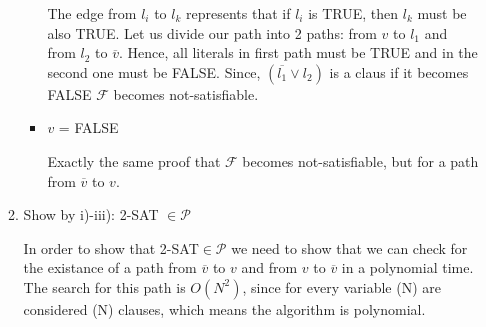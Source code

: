\documentclass{homework}
\begin{document}
\begin{enumerate}[label=(\alph*)]
\begin{enumerate}[label=(\roman*)]
\begin{itemize}
		The edge from $l_i$ to $l_k$ represents that if $l_i$ is TRUE, then $l_k$ must be also TRUE. Let us divide our path into 2 paths: from $v$ to $l_1$ and from $l_2$ to $\overline{v}$. Hence, all literals in first path must be TRUE and in the second one must be FALSE. Since, $(\overline{l_1} \lor l_2)$ is a claus if it becomes FALSE $\mathcal{F}$ becomes not-satisfiable.
		\item $v$ = FALSE
		
		Exactly the same proof that $\mathcal{F}$ becomes not-satisfiable, but for a path from $\overline{v}$ to $v$.
	\end{itemize}
	\item Show by i)-iii): 2-SAT $\in \mathcal{P}$

	In order to show that 2-SAT$\in \mathcal{P}$ we need to show that we can check for the existance of a path from $\overline{v}$ to $v$ and from $v$ to $\overline{v}$ in a polynomial time. The search for this path is $O(N^2)$, since for every variable (N) are considered (N) clauses, which means the algorithm is polynomial. 
	\end{enumerate}
\end{enumerate}
\end{document}

